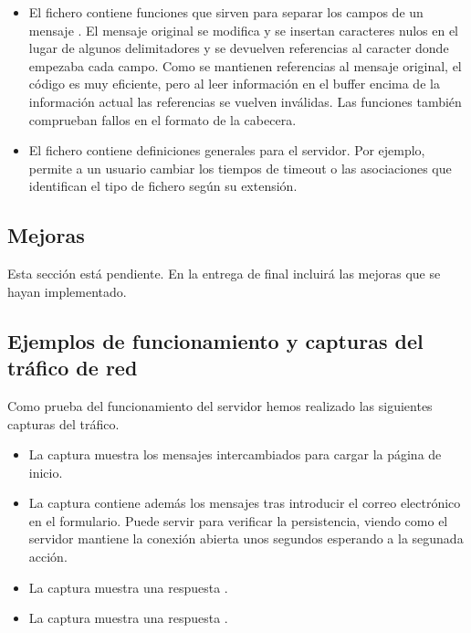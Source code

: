 {\begin{itemize}
\item El fichero  contiene funciones que sirven para separar los campos de un mensaje {\HTTP}. El mensaje original se modifica y se insertan caracteres nulos en el lugar de algunos delimitadores y se devuelven referencias al caracter donde empezaba cada campo. Como se mantienen referencias al mensaje original, el código es muy eficiente, pero al leer información en el buffer encima de la información actual las referencias se vuelven inválidas. Las funciones también comprueban fallos en el formato de la cabecera.

\item El fichero  contiene definiciones generales para el servidor. Por ejemplo, permite a un usuario cambiar los tiempos de timeout o las asociaciones  que identifican el tipo de fichero según su extensión.
\end{itemize}

\subsection{Mejoras}
Esta sección está pendiente. En la entrega de final incluirá las mejoras que se hayan implementado.


\subsection{Ejemplos de funcionamiento y capturas del tráfico de red}
Como prueba del funcionamiento del servidor hemos realizado las siguientes capturas del tráfico.

\begin{itemize}
\item La captura  muestra los mensajes intercambiados para cargar la página de inicio.

\item La captura  contiene además los mensajes tras introducir el correo electrónico en el formulario. Puede servir para verificar la persistencia, viendo como el servidor mantiene la conexión abierta unos segundos esperando a la segunada acción.

\item La captura  muestra una respuesta .

\item La captura  muestra una respuesta .


\end{itemize}}
